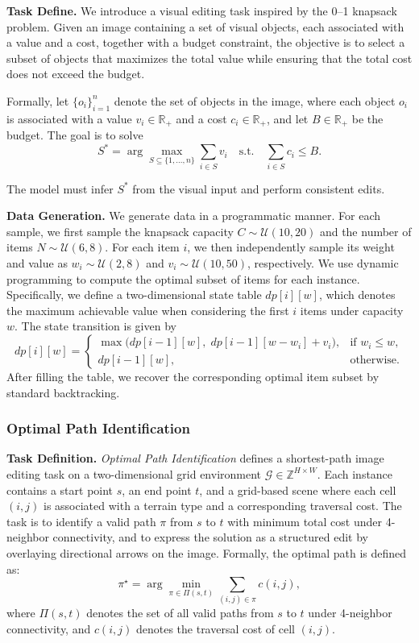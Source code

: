 \documentclass{llmxive}
\begin{document}
\textbf{Task Define.} We introduce a visual editing task inspired by the 0--1 knapsack problem. Given
an image containing a set of visual objects, each associated with a value and
a cost, together with a budget constraint, the objective is to select a subset
of objects that maximizes the total value while ensuring that the total cost
does not exceed the budget.

Formally, let \(\{o_i\}_{i=1}^n\) denote the set of objects in the image,
where each object \(o_i\) is associated with a value \(v_i \in \mathbb{R}_+\)
and a cost \(c_i \in \mathbb{R}_+\), and let \(B \in \mathbb{R}_+\) be the
budget. The goal is to solve
\begin{equation}
S^* = \arg\max_{S \subseteq \{1,\dots,n\}} \sum_{i \in S} v_i
\quad \text{s.t.} \quad
\sum_{i \in S} c_i \le B.
\end{equation}

The model must infer \(S^*\) from the visual input and perform consistent edits.

\textbf{Data Generation.}
We generate data in a programmatic manner. For each sample, we first sample the
knapsack capacity \(C \sim \mathcal{U}(10,20)\) and the number of items
\(N \sim \mathcal{U}(6,8)\). For each item \(i\), we then independently sample
its weight and value as \(w_i \sim \mathcal{U}(2,8)\) and
\(v_i \sim \mathcal{U}(10,50)\), respectively. We use dynamic programming to compute the optimal subset of items for each
instance. Specifically, we define a two-dimensional state table \(dp[i][w]\),
which denotes the maximum achievable value when considering the first \(i\)
items under capacity \(w\). The state transition is given by
\begin{equation}
dp[i][w] =
\begin{cases}
\max\bigl(dp[i-1][w],\; dp[i-1][w-w_i] + v_i\bigr), & \text{if } w_i \le w,\\
dp[i-1][w], & \text{otherwise}.
\end{cases}
\end{equation}
After filling the table, we recover the corresponding optimal item subset by
standard backtracking.

\subsubsection{Optimal Path Identification}

\textbf{Task Definition.}
\textit{Optimal Path Identification} defines a shortest-path image editing task on a two-dimensional grid environment $\mathcal{G} \in \mathbb{Z}^{H \times W}$. Each instance contains a start point $s$, an end point $t$, and a grid-based scene where each cell $(i,j)$ is associated with a terrain type and a corresponding traversal cost. The task is to identify a valid path $\pi$ from $s$ to $t$ with minimum total cost under 4-neighbor connectivity, and to express the solution as a structured edit by overlaying directional arrows on the image. Formally, the optimal path is defined as:
\[
\pi^\star = \arg\min_{\pi \in \Pi(s,t)} \sum_{(i,j) \in \pi} c(i,j),
\]
where $\Pi(s,t)$ denotes the set of all valid paths from $s$ to $t$ under 4-neighbor connectivity, and $c(i,j)$ denotes the traversal cost of cell $(i,j)$.
\end{document}
